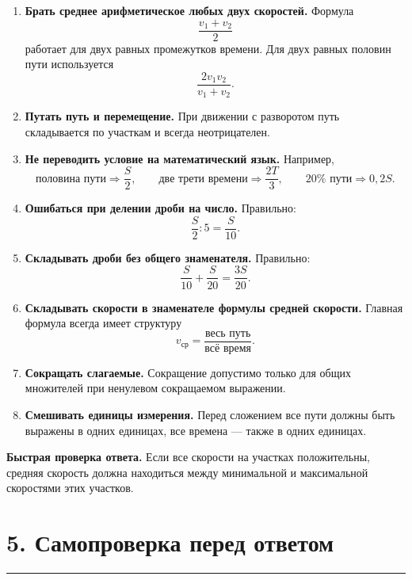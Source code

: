 \documentclass[a4paper,12pt]{article}
\newcommand{\sectionline}{%
  \vspace{0.15em}%
  \noindent\textcolor{accent}{\rule{\linewidth}{0.6pt}}%
  \vspace{0.3em}%
}
\begin{document}
\begin{enumerate}[leftmargin=8mm,itemsep=4pt]

\item
\textbf{Брать среднее арифметическое любых двух скоростей.}
Формула
\[
\frac{v_1+v_2}{2}
\]
работает для двух равных промежутков времени. Для двух равных половин пути используется
\[
\frac{2v_1v_2}{v_1+v_2}.
\]

\item
\textbf{Путать путь и перемещение.}
При движении с разворотом путь складывается по участкам и всегда неотрицателен.

\item
\textbf{Не переводить условие на математический язык.}
Например,
\[
\text{половина пути}\Rightarrow\frac{S}{2},
\qquad
\text{две трети времени}\Rightarrow\frac{2T}{3},
\qquad
20\%\text{ пути}\Rightarrow0{,}2S.
\]

\item
\textbf{Ошибаться при делении дроби на число.}
Правильно:
\[
\frac{S}{2}:5=\frac{S}{10}.
\]

\item
\textbf{Складывать дроби без общего знаменателя.}
Правильно:
\[
\frac{S}{10}+\frac{S}{20}=\frac{3S}{20}.
\]

\item
\textbf{Складывать скорости в знаменателе формулы средней скорости.}
Главная формула всегда имеет структуру
\[
\boxed{v_{\text{ср}}=\frac{\text{весь путь}}{\text{всё время}}}.
\]

\item
\textbf{Сокращать слагаемые.}
Сокращение допустимо только для общих множителей при ненулевом сокращаемом выражении.

\item
\textbf{Смешивать единицы измерения.}
Перед сложением все пути должны быть выражены в одних единицах, все времена --- также в одних единицах.

\end{enumerate}

\textbf{Быстрая проверка ответа.}
Если все скорости на участках положительны, средняя скорость должна находиться между минимальной и максимальной скоростями этих участков.


\section*{5. Самопроверка перед ответом}
\sectionline
\end{document}
